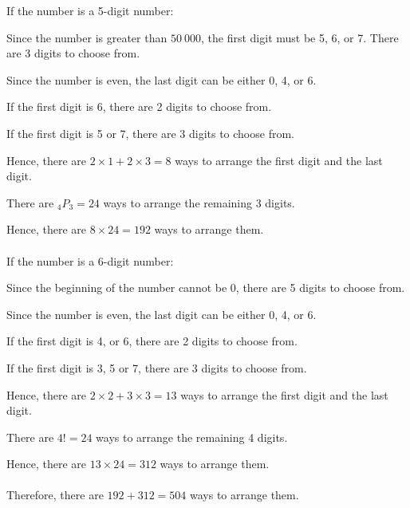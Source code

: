 \documentclass{report}
\newcommand\permtwo[2][^n]{{}_{#1}P_{#2}}
\def\eos{\quad\hbox{\rlap{\hbox{\vrule depth 1.5pt height 2.6mm width 0.2mm \hskip 1mm \vrule height 2.6mm width 0.2mm}}{\vbox{\hrule height 0.2mm width 1.4mm \vskip 2.8mm \hrule depth 1.5pt height -0.35mm width 1.2mm}}}}
\begin{document}
\begin{multicols*}{2}
\begin{enumerate}
\begin{enumerate}
                              If the number is a 5-digit number:

                              Since the number is greater than $50\ 000$, the first digit must be 5, 6, or 7.
                              There are 3 digits to choose from.

                              Since the number is even, the last digit can be either 0, 4, or 6.

                              If the first digit is 6, there are 2 digits to choose from.

                              If the first digit is 5 or 7, there are 3 digits to choose from.

                              Hence, there are $2 \times 1 + 2 \times 3 = 8$ ways to arrange the first digit
                              and the last digit.

                              There are $\permtwo[4]{3} = 24$ ways to arrange the remaining 3 digits.

                              Hence, there are $8 \times 24 = 192$ ways to arrange them. \\ \\ If the number
                              is a 6-digit number:

                              Since the beginning of the number cannot be 0, there are 5 digits to choose
                              from.

                              Since the number is even, the last digit can be either 0, 4, or 6.

                              If the first digit is 4, or 6, there are 2 digits to choose from.

                              If the first digit is 3, 5 or 7, there are 3 digits to choose from.

                              Hence, there are $2 \times 2 + 3 \times 3 = 13$ ways to arrange the first digit
                              and the last digit.

                              There are $4! = 24$ ways to arrange the remaining 4 digits.

                              Hence, there are $13 \times 24 = 312$ ways to arrange them.\\\\ Therefore,
                              there are $192 + 312 = 504$ ways to arrange them. $\eos$
                  \end{enumerate}


\end{enumerate}
\end{multicols*}
\end{document}
